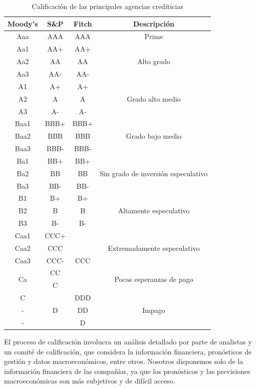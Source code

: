 \documentclass{article}
\begin{document}
\begin{table}
\centering
\begin{tabular}{|c|c|c|c|}
\hline
\textbf{Moody's} & \textbf{S\&P} & \textbf{Fitch} & \textbf{Descripción} \\ \hline
Aaa  & AAA  & AAA & Prime \\ \hline
Aa1  & AA+ & AA+ &  \\
Aa2  & AA   & AA & Alto grado \\ 
Aa3  & AA-  & AA- & \\ \hline
A1   & A+   & A+ & \\
A2   & A    & A & Grado alto medio \\
A3   & A-   & A- & \\  \hline
Baa1 & BBB+ & BBB+ & \\
Baa2 & BBB  & BBB & Grado bajo medio\\
Baa3 & BBB- & BBB- & \\ \hline
Ba1  & BB+  & BB+ & \\
Ba2  & BB   & BB & Sin grado de inversión especulativo  \\
Ba3  & BB-  & BB- &  \\ \hline
B1   & B+   & B+ &  \\
B2   & B    & B & Altamente especulativo \\
B3   & B-   & B- &  \\ \hline
Caa1 & CCC+ & \multirow{5}{*}{CCC} & \multirow{3}{*}{Extremadamente especulativo}  \\ 
Caa2 & CCC  &  & \\ 
Caa3 & CCC- &  & \\ \cline{1-2} \cline{4-4}
\multirow{2}{*}{Ca}   & CC   &  & \multirow{2}{*}{Pocas esperanzas de pago}\\
    & C   &  &  \\ \hline
C & \multirow{3}{*}{D} & DDD & \\
- &  & DD &  Impago \\
- &   & D & \\ \hline
\end{tabular}
\caption{Calificación de las principales agencias crediticias}
\label{tab:credit-ratings}    
\end{table}


El proceso de calificación involucra un análisis detallado por parte de analistas y un comité de calificación, que considera la información financiera, pronósticos de gestión y datos macroeconómicos, entre otros. Nosotros disponemos solo de la información financiera de las compañías, ya que los pronósticos y las previsiones macroeconómicas son más subjetivos y de difícil acceso.
\end{document}
